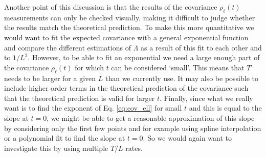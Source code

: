 Another point of this discussion is that the results of the covariance $\rho_\ell(t)$ measurements can only be checked visually, making it difficult to judge whether the results match the theoretical prediction.
To make this more quantitative we would want to fit the expected covariance with a general exponential function and compare the different estimations of $\Lambda$ as a result of this fit to each other and to $1/L^2$.
However, to be able to fit an exponential we need a large enough part of the covariance $\rho_\ell(t)$ for which $t$ can be considered `small'.
This means that $T$ needs to be larger for a given $L$ than we currently use.
It may also be possible to include higher order terms in the theoretical prediction of the covariance such that the theoretical prediction is valid for larger $t$.
Finally, since what we really want is to find the exponent of Eq. \eqref{eq:cov_ell} for small $t$ and this is equal to the slope at $t = 0$, we might be able to get a reasonable approximation of this slope by considering only the first few points and for example using spline interpolation or a polynomial fit to find the slope at $t=0$.
So we would again want to investigate this by using multiple $T/L$ rates.